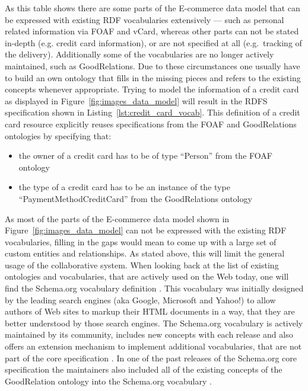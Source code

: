 As this table shows there are some parts of the \gls{E-commerce} data model that can be expressed with existing \gls{RDF} vocabularies extensively --- such as personal related information via \gls{FOAF} and \gls{vCard}, whereas other parts can not be stated in-depth (e.g. credit card information), or are not specified at all (e.g.\ tracking of the delivery). Additionally some of the vocabularies are no longer actively maintained, such as GoodRelations. Due to these circumstances one usually have to build an own ontology that fills in the missing pieces and refers to the existing concepts whenever appropriate. Trying to model the information of a credit card as displayed in Figure~\ref{fig:images_data_model} will result in the \gls{RDFS} specification shown in Listing~\ref{lst:credit_card_vocab}. This definition of a credit card resource explicitly reuses specifications from the \gls{FOAF} and GoodRelations ontologies by specifying that: \@

\begin{itemize}
	\item the owner of a credit card has to be of type ``Person'' from the \gls{FOAF} ontology
	\item the type of a credit card has to be an instance of the type ``PaymentMethodCreditCard'' from the GoodRelations ontology
\end{itemize}


As most of the parts of the \gls{E-commerce} data model shown in Figure~\ref{fig:images_data_model} can not be expressed with the existing \gls{RDF} vocabularies, filling in the gaps would mean to come up with a large set of custom entities and relationships. As stated above, this will limit the general usage of the collaborative system. When looking back at the list of existing ontologies and vocabularies, that are actively used on the Web today, one will find the Schema.org vocabulary definition \citep{Schema.org}. This vocabulary was initially designed by the leading search engines (aka Google, Microsoft and Yahoo!) to allow authors of Web sites to markup their \gls{HTML} documents in a way, that they are better understood by those search engines. The Schema.org vocabulary is actively maintained by its community, includes new concepts with each release and also offers an extension mechanism to implement additional vocabularies, that are not part of the core specification \citep{SchemaExtensions}. In one of the past releases of the Schema.org core specification the maintainers also included all of the existing concepts of the GoodRelation ontology into the Schema.org vocabulary \citep{SchemaGoodRelation}. \\

